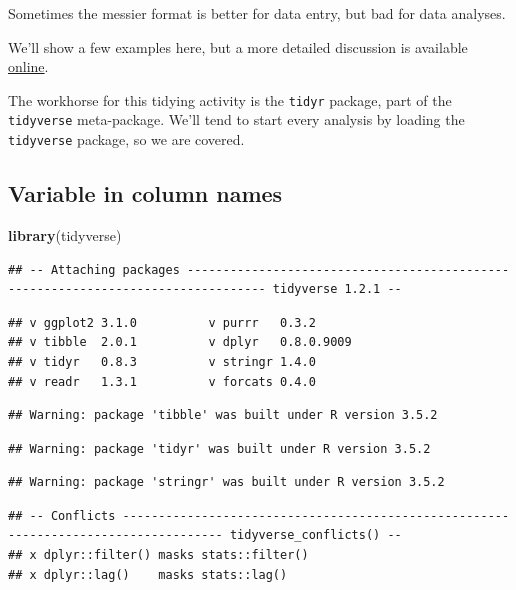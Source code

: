 \documentclass[12pt,letterpaperpaper,openany]{book}
\newenvironment{Shaded}{\begin{snugshade}}{\end{snugshade}}
\newcommand{\KeywordTok}[1]{\textcolor[rgb]{0.13,0.29,0.53}{\textbf{#1}}}
\newcommand{\NormalTok}[1]{#1}
\begin{document}
Sometimes the messier format is better for data entry, but bad for data analyses.

We'll show a few examples here, but a more detailed discussion is available \href{https://cran.r-project.org/web/packages/tidyr/vignettes/tidy-data.html}{online}.

The workhorse for this tidying activity is the \texttt{tidyr} package, part of the \texttt{tidyverse}
meta-package. We'll tend to start every analysis by loading the \texttt{tidyverse} package,
so we are covered.

\hypertarget{variable-in-column-names}{%
\subsection{Variable in column names}\label{variable-in-column-names}}

\begin{Shaded}
\begin{Highlighting}[]
\KeywordTok{library}\NormalTok{(tidyverse)}
\end{Highlighting}
\end{Shaded}

\begin{verbatim}
## -- Attaching packages --------------------------------------------------------------------------------- tidyverse 1.2.1 --
\end{verbatim}

\begin{verbatim}
## v ggplot2 3.1.0          v purrr   0.3.2     
## v tibble  2.0.1          v dplyr   0.8.0.9009
## v tidyr   0.8.3          v stringr 1.4.0     
## v readr   1.3.1          v forcats 0.4.0
\end{verbatim}

\begin{verbatim}
## Warning: package 'tibble' was built under R version 3.5.2
\end{verbatim}

\begin{verbatim}
## Warning: package 'tidyr' was built under R version 3.5.2
\end{verbatim}

\begin{verbatim}
## Warning: package 'stringr' was built under R version 3.5.2
\end{verbatim}

\begin{verbatim}
## -- Conflicts ------------------------------------------------------------------------------------ tidyverse_conflicts() --
## x dplyr::filter() masks stats::filter()
## x dplyr::lag()    masks stats::lag()
\end{verbatim}
\end{document}
